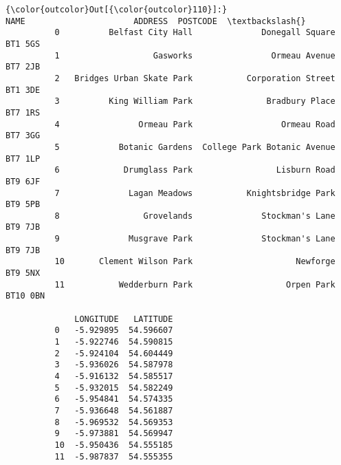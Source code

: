 \documentclass[11pt]{article}
\begin{document}
\begin{Verbatim}[commandchars=\\\{\}]
{\color{outcolor}Out[{\color{outcolor}110}]:}                         NAME                      ADDRESS  POSTCODE  \textbackslash{}
          0          Belfast City Hall              Donegall Square   BT1 5GS   
          1                   Gasworks                Ormeau Avenue   BT7 2JB   
          2   Bridges Urban Skate Park           Corporation Street   BT1 3DE   
          3          King William Park               Bradbury Place   BT7 1RS   
          4                Ormeau Park                  Ormeau Road   BT7 3GG   
          5            Botanic Gardens  College Park Botanic Avenue   BT7 1LP   
          6             Drumglass Park                 Lisburn Road   BT9 6JF   
          7              Lagan Meadows           Knightsbridge Park   BT9 5PB   
          8                 Grovelands              Stockman's Lane   BT9 7JB   
          9              Musgrave Park              Stockman's Lane   BT9 7JB   
          10       Clement Wilson Park                     Newforge   BT9 5NX   
          11           Wedderburn Park                   Orpen Park  BT10 0BN   
          
              LONGITUDE   LATITUDE  
          0   -5.929895  54.596607  
          1   -5.922746  54.590815  
          2   -5.924104  54.604449  
          3   -5.936026  54.587978  
          4   -5.916132  54.585517  
          5   -5.932015  54.582249  
          6   -5.954841  54.574335  
          7   -5.936648  54.561887  
          8   -5.969532  54.569353  
          9   -5.973881  54.569947  
          10  -5.950436  54.555185  
          11  -5.987837  54.555355  
\end{Verbatim}
            
\end{document}
